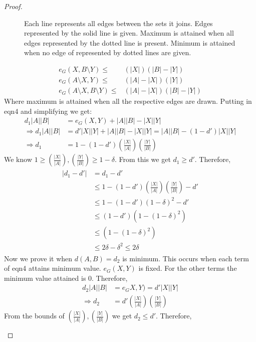 \documentclass{article}
\begin{document}
\begin{proof}
\begin{figure}
\begin{tikzpicture}[x=0.75pt,y=0.75pt,yscale=-1,xscale=1]
	\end{tikzpicture}
	\caption{Each line represents all edges between the sets it joins. Edges represented by the solid line is given. Maximum is attained when all edges represented by the dotted line is present. Minimum is attained when no edge of represented by dotted lines are given.}
\end{figure}
\begin{align}
	e_G(X,B\setminus Y)\leq & (|X|)(|B|-|Y|)\\
	e_G(A\setminus X,Y)\leq &(|A|-|X|)(|Y|)\\
	e_G(A\setminus X,B\setminus Y)\leq & (|A|-|X|)(|B|-|Y|)
\end{align}
Where maximum is attained when all the respective edges are drawn.
Putting in eqn4 and simplifying we get:
\begin{align}
 d_1|A||B|&=e_G(X,Y)+|A||B|-|X||Y|\\
 \Rightarrow d_1|A||B|&=d'|X||Y|+|A||B|-|X||Y|=|A||B|-(1-d')|X||Y|\\
 \Rightarrow d_1&=1-(1-d')\left(\frac{|X|}{|A|}\right)\left(\frac{|Y|}{|B|}\right)
\end{align}
We know $1\geq \left(\frac{|X|}{|A|}\right),\left(\frac{|Y|}{|B|}\right)\geq  1-\delta$. From this we get $d_1\geq  d'$. Therefore,
\begin{align}
	\begin{split}
	|d_1-d'|&=d_1-d'\\
	&\leq  1-(1-d')\left(\frac{|X|}{|A|}\right)\left(\frac{|Y|}{|B|}\right)-d'\\
	&\leq  1-(1-d')(1-\delta)^2-d'\\
	&\leq  (1-d')\left(1-(1-\delta)^2\right)\\
	&\leq  \left(1-(1-\delta)^2\right)\\
	&\leq  2\delta-\delta^2\leq  2\delta
	\end{split}
\end{align}
Now we prove it when $d(A,B)=d_2$ is minimum. This occurs when each term of eqn4 attains minimum value. $e_G(X,Y)$ is fixed. For the other terms the minimum value attained is 0. Therefore,
\begin{align}
	d_2|A||B|&=e_GX,Y)=d'|X||Y|\\
\Rightarrow d_2&=d'\left(\frac{|X|}{|A|}\right)\left(\frac{|Y|}{|B|}\right)
\end{align}
From the bounds of $\left(\frac{|X|}{|A|}\right),\left(\frac{|Y|}{|B|}\right)$ we get $d_2\leq  d'$. Therefore, 
\begin{align}
	\begin{split}

\end{split}
\end{align}
\end{proof}
\end{document}
